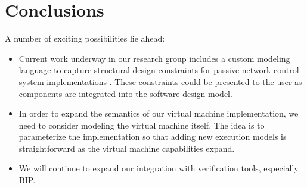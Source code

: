 \section{Conclusions}

A number of exciting possibilities lie ahead:

\begin{itemize}

\item Current work underway in our research group includes a custom modeling language to capture structural design constraints for passive network control system implementations \cite{ncs:mic}.  These constraints could be presented to the user as components are integrated into the software design model.

\item In order to expand the semantics of our virtual machine implementation, we need to consider modeling the virtual machine itself.  The idea is to parameterize the implementation so that adding new execution models is straightforward as the virtual machine capabilities expand.

\item We will continue to expand our integration with verification tools, especially BIP.

\end{itemize}